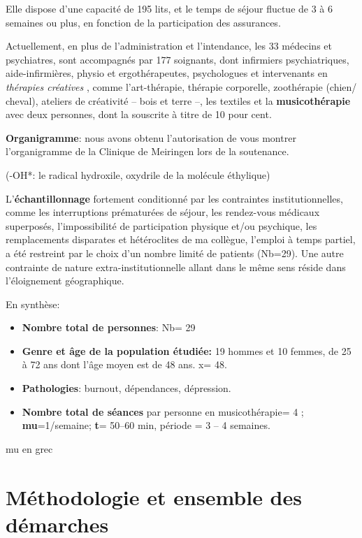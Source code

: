 Elle dispose d'une capacité de
195 lits, et le temps de séjour fluctue de 3 à 6 semaines ou plus, en
fonction de la participation des assurances.

Actuellement, en plus de l'administration et l'intendance, les 33
médecins et psychiatres, sont
accompagnés par 177
soignants, dont infirmiers psychiatriques, aide-infirmières, physio et
ergothérapeutes, 
psychologues et intervenants en \textit{thérapies
créatives }, comme l'art-thérapie, thérapie
corporelle, zoothérapie (chien/ cheval),  ateliers de créativité --
bois et terre --,  les textiles et la\textbf{ musicothérapie} avec deux
personnes, dont la souscrite à titre de 10 pour cent.


\textbf{Organigramme}: nous avons obtenu l'autorisation de vous
montrer l'organigramme de la Clinique de Meiringen lors de la
soutenance.




(-OH*:  le radical hydroxile, oxydrile de la molécule éthylique)




L'\textbf{échantillonnage} fortement conditionné par les contraintes
institutionnelles, comme les interruptions prématurées de séjour, les rendez-vous
 médicaux superposés, l'impossibilité de participation physique et/ou
 psychique, les remplacements disparates et hétéroclites de ma
 collègue, l'emploi à
 temps partiel, a été restreint  par le choix d'un nombre limité de
 patients (Nb=29).
Une autre contrainte de nature extra-institutionnelle allant dans le
même sens réside dans l'éloignement géographique.

En synthèse:
 \begin{itemize}
 
 \item \textbf{Nombre total de personnes}: Nb= 29 
\item\textbf{Genre et âge de la population étudiée:}  19 hommes et 10 femmes, de 25 à 72
  ans dont l'âge moyen est de 48 ans. x= 48.
 \item\textbf{Pathologies}: burnout, dépendances, dépression.
 \item \textbf{Nombre total de séances} par personne en
   musicothérapie= 4 ;   \textbf{mu}=1/semaine;  
 \textbf{t}= 50--60 min, période = 3 -- 4 semaines.
\end{itemize}




 mu en grec
\section{Méthodologie et  ensemble des démarches}






